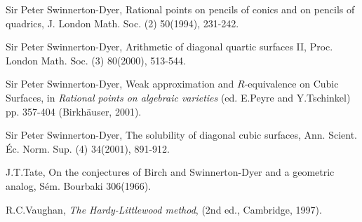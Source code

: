 \documentclass[12pt]{article}
\begin{document}
\noindent [37] Sir Peter Swinnerton-Dyer, Rational points on pencils of
conics and on pencils of quadrics, J. London Math. Soc. (2) 50(1994),
231-242.

\noindent [38] Sir Peter Swinnerton-Dyer, Arithmetic of diagonal quartic
surfaces II, Proc. London Math. Soc. (3) 80(2000), 513-544.

\noindent [39] Sir Peter Swinnerton-Dyer, Weak approximation and
$R$-equivalence on Cubic Surfaces, in \textit{Rational points on algebraic
varieties} (ed. E.Peyre and Y.Tschinkel) pp. 357-404 (Birkh\"{a}user, 2001).

\noindent [40] Sir Peter Swinnerton-Dyer, The solubility of diagonal cubic
surfaces, Ann. Scient. \'{E}c. Norm. Sup. (4) 34(2001), 891-912.

\noindent [41] J.T.Tate, On the conjectures of Birch and Swinnerton-Dyer
and a geometric analog, S\'{e}m. Bourbaki 306(1966).

\noindent [42] R.C.Vaughan, \textit{The Hardy-Littlewood method}, (2nd ed.,
Cambridge, 1997).
\end{document}
